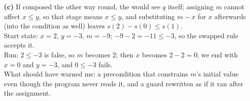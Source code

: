 \documentclass[11pt]{article}
\begin{document}
\begin{answer}
\textbf{(c)} If  composed the other way round, the  would see
$q$ itself; assigning $m$ cannot affect $x \leq y$, so that stage means $x
\leq y$, and substituting $m - x$ for $x$ afterwards (into the condition as
well) leaves $s(2) - s(0) \leq s(1)$. \\
Start state: $x = 2$, $y = -3$, $m = -9$; $-9 - 2 = -11 \leq -3$, so the
swapped rule accepts it. \\
Run: $2 \leq -3$ is false, so $m$ becomes $2$; then $x$ becomes $2 - 2 = 0$;
we end with $x = 0$ and $y = -3$, and $0 \leq -3$ fails. \\
What should have warned me: a precondition that constrains $m$'s initial value
even though the program never reads it, and a guard rewritten as if it ran
after the assignment.
\end{answer}

\end{document}

